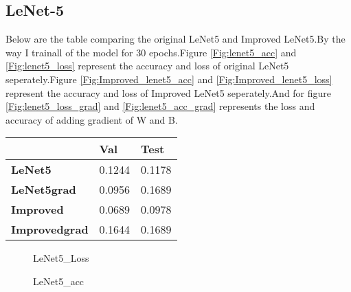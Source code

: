 \documentclass[conference]{IEEEtran}
\begin{document}
    \subsection{LeNet-5}
    Below are the table comparing the original LeNet5 and Improved LeNet5.By the way I trainall of the model for 30 epochs.Figure \ref{Fig:lenet5_acc} and \ref{Fig:lenet5_loss} represent the accuracy and loss of original LeNet5 seperately.Figure \ref{Fig:Improved_lenet5_acc} and \ref{Fig:Improved_lenet5_loss} represent the accuracy and loss of Improved LeNet5 seperately.And for figure \ref{Fig:lenet5_loss_grad} and \ref{Fig:lenet5_acc_grad} represents the loss and accuracy of adding gradient of W and B.
        

    \begin{table}[htb]
    \begin{center}
        \begin{tabular}{l|l|l}
                          &   Val    &   Test     \\ \hline
        \textbf{LeNet5}   &   0.1244   &  0.1178 \\ 
        \textbf{LeNet5grad}   &   0.0956   &  0.1689 \\ 
        \textbf{Improved} &   0.0689 &  0.0978 \\ 
        \textbf{Improvedgrad} &   0.1644 &   0.1689 \\ 
    \end{tabular}
    \end{center}
    \end{table}

    \begin{figure}[htb]
        \centering
        \renewcommand{\figurename}{Figure}
            
        \caption{LeNet5\_Loss}
        \label{fig:loss}
    \end{figure}

    \begin{figure}[htb]
        \centering
        \renewcommand{\figurename}{Figure}
        \caption{LeNet5\_acc}
        \label{fig:acc}
    \end{figure}
\end{document}
